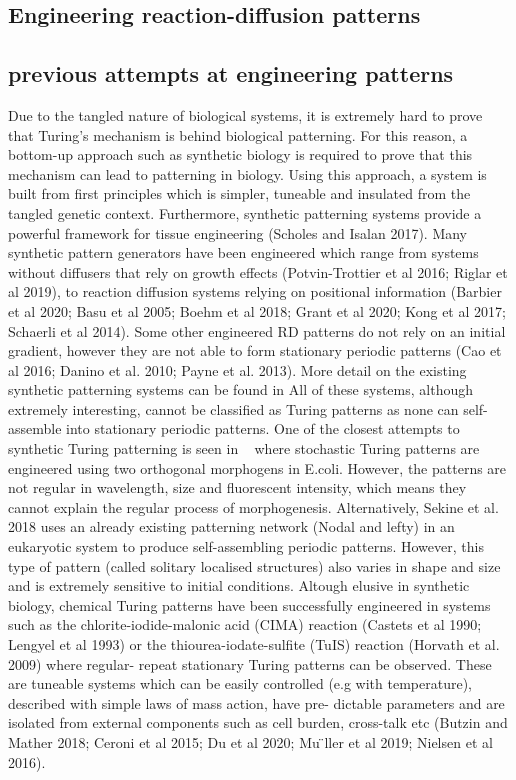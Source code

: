 \begin{itemize}
\section{ Engineering reaction-diffusion patterns}
\subsection{previous attempts at engineering patterns}
Due to the tangled nature of biological systems, it is extremely hard to prove that Turing’s mechanism is behind biological patterning. 
For this reason, a bottom-up approach such as synthetic biology is required to prove that this mechanism can lead to patterning in biology. 
Using this approach, a system is built from first principles which is simpler, tuneable and insulated from the tangled genetic context. 
Furthermore, synthetic patterning systems provide a powerful framework for tissue engineering (Scholes and Isalan 2017).
Many synthetic pattern generators have been engineered which range from systems without diffusers that rely on growth effects (Potvin-Trottier et al 2016; Riglar et al 2019), to reaction diffusion systems relying on positional information (Barbier et al 2020; Basu et al 2005; Boehm et al 2018; Grant et al 2020; Kong et al 2017; Schaerli et al 2014). 
Some other engineered RD patterns do not rely on an initial gradient, however they are not able to form stationary periodic patterns (Cao et al 2016; Danino et al. 2010; Payne et al. 2013). 
More detail on the existing synthetic patterning systems can be found in
All of these systems, although extremely interesting, cannot be classified as Turing patterns as none can self-assemble into stationary periodic patterns. 
One of the closest attempts to synthetic Turing patterning is seen in ~\parencite{Karig2018} where stochastic Turing patterns are engineered using two orthogonal morphogens in E.coli. However, the patterns are not regular in wavelength, size and fluorescent intensity, which means they cannot explain the regular process of morphogenesis. Alternatively, Sekine et al. 2018 uses an already existing patterning network (Nodal and lefty) in an eukaryotic system to produce self-assembling periodic patterns. However, this type of pattern (called solitary localised structures) also varies in shape and size and is extremely sensitive to initial conditions. Altough elusive in synthetic biology, chemical Turing patterns have been successfully engineered in systems such as the chlorite-iodide-malonic acid (CIMA) reaction (Castets et al 1990; Lengyel et al 1993) or the thiourea-iodate-sulfite (TuIS) reaction (Horvath et al. 2009) where regular- repeat stationary Turing patterns can be observed. These are tuneable systems which can be easily controlled (e.g with temperature), described with simple laws of mass action, have pre- dictable parameters and are isolated from external components such as cell burden, cross-talk etc (Butzin and Mather 2018; Ceroni et al 2015; Du et al 2020; Mu ̈ller et al 2019; Nielsen et al 2016).

\end{itemize}
